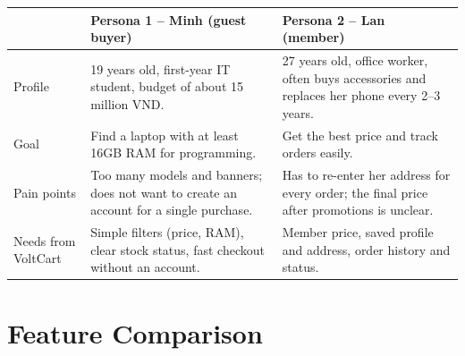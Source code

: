 \documentclass[12pt,a4paper]{article}
\newcommand{\ProjectName}{VoltCart}
\begin{document}
\begin{tabularx}{\linewidth}{|L{2.4cm}|Y|Y|}
\hline
{}  & \textbf{Persona 1 -- Minh (guest buyer)} & \textbf{Persona 2 -- Lan (member)} \\ \hline \endhead
Profile     & 19 years old, first-year IT student, budget of about 15 million VND. &
              27 years old, office worker, often buys accessories and replaces her phone every 2--3 years. \\ \hline
Goal        & Find a laptop with at least 16GB RAM for programming. &
              Get the best price and track orders easily. \\ \hline
Pain points & Too many models and banners; does not want to create an account for a single purchase. &
              Has to re-enter her address for every order; the final price after promotions is unclear. \\ \hline
Needs from \ProjectName{} & Simple filters (price, RAM), clear stock status, fast checkout without an account. &
              Member price, saved profile and address, order history and status. \\ \hline
\end{tabularx}

\section{Feature Comparison}
\end{document}

